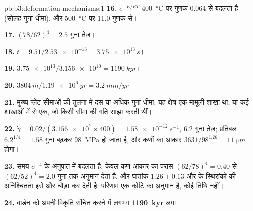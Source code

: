 \begin{solution}{pb:b3:deformation-mechanisms:1}
\textbf{16.} $e^{-E/RT}$ \qty{400}{\celsius} पर गुणक 0.064 से
बदलता है (सोलह गुना धीमा), और \qty{500}{\celsius} पर 11.0 गुणक से।

\textbf{17.} $(78/62)^4 = 2.5$ गुना तेज़।

\textbf{18.} $t = 9.51/\num{2.53e-13} = \qty{3.75e13}{s}$।

\textbf{19.} $\num{3.75e13}/\num{3.156e10} = \qty{1190}{kyr}$।

\textbf{20.} $\qty{3804}{m}/\qty{1.19e6}{yr} = \qty{3.2}{mm/yr}$।

\textbf{21.} मुख्य प्लेट सीमाओं की तुलना में दस या अधिक गुना धीमा:
यह क्षेत्र एक मामूली शाखा था, या कई शाखाओं में से एक, जो किसी सीमा की गति साझा करती थीं।

\textbf{22.} $\dot\gamma = 0.02/(\num{3.156e7}\times400) = \qty{1.58e-12}{s^{-1}}$,
6.2 गुना तेज़; प्रतिबल $6.2^{1/4} = 1.58$ गुना बढ़कर \qty{98}{MPa} हो जाता है, और
कणों का आकार $3631/98^{1.26} = \qty{11}{\micro m}$ होगा।

\textbf{23.} समय $\sigma^{-4}$ के अनुपात में बदलता है: केवल कण-आकार का परास
$(62/78)^4 = 0.40$ से $(62/52)^4 = 2.0$ गुना तक अनुमान देता है, और
घातांक $1.26 \pm 0.13$ और  के स्थिरांकों की अनिश्चितता
इसे और चौड़ा कर देती है: परिणाम एक कोटि का अनुमान है, कोई तिथि नहीं।

\textbf{24.} वार्डन  को अपनी विकृति संचित करने में लगभग
\textbf{\qty[text-series-to-math=true]{1190}{kyr}} लगा।
\end{solution}
